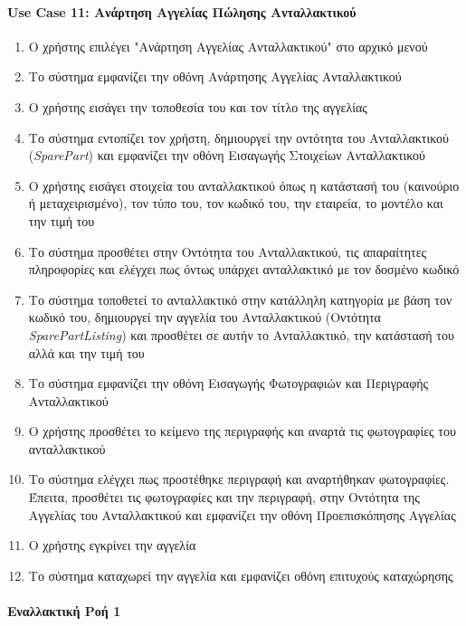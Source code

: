 \documentclass{../ol-softwaremanual}
\begin{document}
	\paragraph{\en Use Case 11: \gr Ανάρτηση Αγγελίας Πώλησης Ανταλλακτικού \gr}
	\begin{enumerate}
		\item Ο χρήστης επιλέγει \en"\gr Ανάρτηση Αγγελίας Ανταλλακτικού\en" \gr στο αρχικό μενού
		\item Το σύστημα εμφανίζει την οθόνη Ανάρτησης Αγγελίας Ανταλλακτικού
		\item Ο χρήστης εισάγει την τοποθεσία του και τον τίτλο της αγγελίας		
		\item Το σύστημα εντοπίζει τον χρήστη, δημιουργεί την οντότητα του Ανταλλακτικού (\en \textit{SparePart}\gr) και εμφανίζει την οθόνη Εισαγωγής Στοιχείων Ανταλλακτικού		
		\item Ο χρήστης εισάγει στοιχεία του ανταλλακτικού όπως η κατάστασή του (καινούριο ή μεταχειρισμένο), τον τύπο του, τον κωδικό του, την εταιρεία, το μοντέλο και την τιμή του		
		\item Το σύστημα προσθέτει στην Οντότητα του Ανταλλακτικού, τις απαραίτητες πληροφορίες και ελέγχει πως όντως υπάρχει ανταλλακτικό με τον δοσμένο κωδικό		
		\item Το σύστημα τοποθετεί το ανταλλακτικό στην κατάλληλη κατηγορία με βάση τον κωδικό του,  δημιουργεί την αγγελία του Ανταλλακτικού (Οντότητα \en\textit{SparePartListing}\gr) και προσθέτει σε αυτήν το Ανταλλακτικό, την κατάστασή του αλλά και την τιμή του
		\item Το σύστημα εμφανίζει την οθόνη Εισαγωγής Φωτογραφιών και Περιγραφής Ανταλλακτικού
		\item Ο χρήστης προσθέτει το κείμενο της περιγραφής και αναρτά τις φωτογραφίες του ανταλλακτικού		
		\item Το σύστημα ελέγχει πως προστέθηκε περιγραφή και αναρτήθηκαν φωτογραφίες. Έπειτα, προσθέτει τις φωτογραφίες και την περιγραφή, στην Οντότητα της Αγγελίας του Ανταλλακτικού και εμφανίζει την οθόνη Προεπισκόπησης Αγγελίας
		\item Ο χρήστης εγκρίνει την αγγελία		
		\item Το σύστημα καταχωρεί την αγγελία και εμφανίζει οθόνη επιτυχούς καταχώρησης
	\end{enumerate}
	
	
	\paragraph{Εναλλακτική Ροή 1}
	
\end{document}
